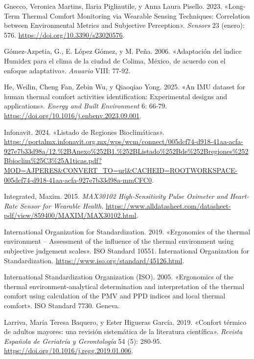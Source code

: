 \documentclass[
  12pt,
  letterpaper,
  DIV=11,
  numbers=noendperiod]{scrreport}
\newlength{\cslhangindent}
\newlength{\cslentryspacingunit} %
\newenvironment{CSLReferences}[2] %
 {%
  \setlength{\parindent}{0pt}
  \ifodd #1
  \let\oldpar\par
  \def\par{\hangindent=\cslhangindent\oldpar}
  \fi
  \setlength{\parskip}{#2\cslentryspacingunit}
 }%
 {}
\begin{document}
\begin{CSLReferences}{1}{0}
\leavevmode{}%
Gnecco, Veronica Martins, Ilaria Pigliautile, y Anna Laura Pisello.
2023. {«Long-Term Thermal Comfort Monitoring via Wearable Sensing
Techniques: Correlation between Environmental Metrics and Subjective
Perception»}. \emph{Sensors} 23 (enero): 576.
\url{https://doi.org/10.3390/s23020576}.

\leavevmode{}%
Gómez-Azpetia, G., E. López Gómez, y M. Peña. 2006. {«Adaptaci{ó}n del
{ı́}ndice Humidex para el clima de la ciudad de Colima, M{é}xico, de
acuerdo con el enfoque adaptativo»}. \emph{Anuario} VIII: 77-92.

\leavevmode{}%
He, Weilin, Cheng Fan, Zebin Wu, y Qiaoqiao Yong. 2025. {«An IMU dataset
for human thermal comfort activities identification: Experimental
designs and applications»}. \emph{Energy and Built Environment} 6:
66-79. \url{https://doi.org/10.1016/j.enbenv.2023.09.001}.

\leavevmode{}%
Infonavit. 2024. {«Listado de Regiones Bioclimáticas»}.
\url{https://portalmx.infonavit.org.mx/wps/wcm/connect/005dcf74-d918-41aa-acfa-927e7b33d98a/12.\%2BAnexo\%252B1.\%252BListado\%252Bde\%252Bregiones\%252Bbioclim\%25C3\%25A1ticas.pdf?MOD=AJPERES\&CONVERT_TO=url\&CACHEID=ROOTWORKSPACE-005dcf74-d918-41aa-acfa-927e7b33d98a-mmCFC0}.

\leavevmode{}%
Integrated, Maxim. 2015. \emph{MAX30102 High-Sensitivity Pulse Oximeter
and Heart-Rate Sensor for Wearable Health}.
\url{https://www.alldatasheet.com/datasheet-pdf/view/859400/MAXIM/MAX30102.html}.

\leavevmode{}%
International Organization for Standardization. 2019. {«Ergonomics of
the thermal environment -- Assessment of the influence of the thermal
environment using subjective judgement scales»}. ISO Standard 10551.
{International Organization for Standardization}.
\url{https://www.iso.org/standard/45126.html}.

\leavevmode{}%
International Standardization Organization (ISO). 2005. {«Ergonomics of
the thermal environment-analytical determination and interpretation of
the thermal comfort using calculation of the PMV and PPD indices and
local thermal comfort»}. ISO Standard 7730. Geneva.

\leavevmode{}%
Larriva, María Teresa Baquero, y Ester Higueras García. 2019. {«Confort
térmico de adultos mayores: una revisión sistemática de la literatura
científica»}. \emph{Revista Española de Geriatría y Gerontología} 54
(5): 280-95. \url{https://doi.org/10.1016/j.regg.2019.01.006}.


\end{CSLReferences}
\end{document}

